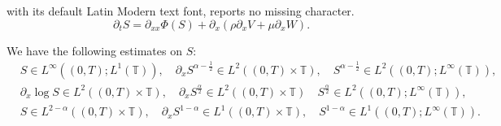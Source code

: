 \documentclass[10pt,a4paper]{amsart}
\newcommand {\T}  { {\mathbb{T}} }
\begin{document}
with its default Latin Modern text font, reports no missing character.
\begin{equation}\label{eq:prelim_dS}
\partial_t S 
 =  
\partial_{xx} \Phi(S)
 + \partial_x \left(\rho\partial_x V + \mu\partial_x W \right).
\end{equation}

\begin{proposition}\label{prop:spatial_S}
We have the following estimates on $S$:
\begin{align*}
&S\in L^{\infty}((0,T); L^{1}(\T)), \quad \partial_x S^{\alpha-\frac{1}{2}}\in L^{2}((0,T)\times \T),\quad S^{\alpha-\frac{1}{2}}\in L^{2}((0,T); L^{\infty}(\T)),\\
&\partial_x \log S\in L^{2}((0,T)\times \T), \quad \partial_x S^{\frac{\alpha}{2}}\in L^{2}((0,T)\times \T) \quad S^{\frac{\alpha}{2}} \in L^{2}((0,T); L^{\infty}(\T)),\\
&S\in L^{2-\alpha}((0,T)\times \T),  \quad \partial_x S^{1-\alpha}\in L^{1}((0,T)\times \T), \quad  S^{1-\alpha}\in L^{1}((0,T); L^{\infty}(\T)). 
\end{align*}
\end{proposition}
\end{document}
